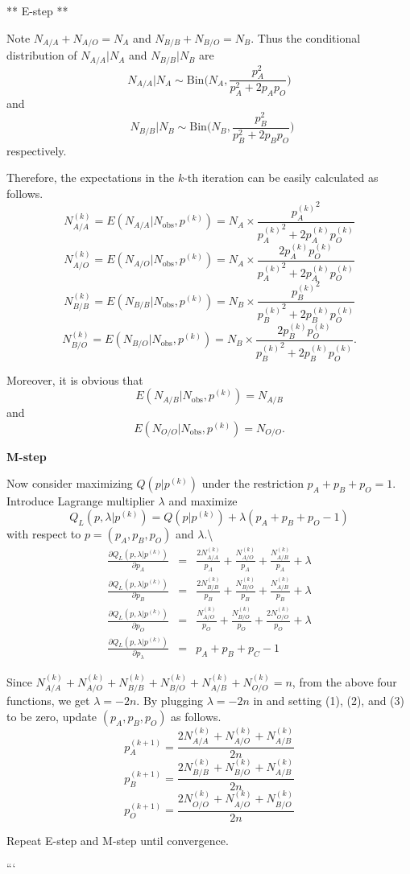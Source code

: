 \documentclass[]{article}
\begin{document}
** E-step **

Note \(N_{A/A} + N_{A/O} = N_A\) and \(N_{B/B} + N_{B/O} = N_B\). Thus
the conditional distribution of \(N_{A/A}|N_A\) and \(N_{B/B}|N_B\) are
\[
N_{A/A}|N_A \sim \text{Bin}\Biggl( N_A, \frac{p_A^2}{p_A^2 + 2 p_A p_O} \Biggr)
\] and \[
 \,\,\, N_{B/B}|N_B \sim \text{Bin}\Biggl( N_B, \frac{p_B^2}{p_B^2 + 2 p_B p_O} \Biggr)
\] respectively.

Therefore, the expectations in the \(k\)-th iteration can be easily
calculated as follows. \[
N_{A/A}^{(k)} = E(N_{A/A}|N_{\text{obs}}, p^{(k)}) = N_A \times \frac{{p_A^{(k)}}^2}{{p_A^{(k)}}^2 + 2 p_A^{(k)} p_O^{(k)}}
\] \[
N_{A/O}^{(k)} = E(N_{A/O}|N_{\text{obs}}, p^{(k)}) = N_A \times \frac{2 p_A^{(k)} p_O^{(k)}}{{p_A^{(k)}}^2 + 2 p_A^{(k)} p_O^{(k)}}
\] \[
N_{B/B}^{(k)} = E(N_{B/B}|N_{\text{obs}}, p^{(k)}) = N_B \times \frac{{p_B^{(k)}}^2}{{p_B^{(k)}}^2 + 2 p_B^{(k)} p_O^{(k)}}
\] \[
N_{B/O}^{(k)} = E(N_{B/O}|N_{\text{obs}}, p^{(k)}) = N_B \times \frac{2 p_B^{(k)} p_O^{(k)}}{{p_B^{(k)}}^2 + 2 p_B^{(k)} p_O^{(k)}}.
\]

Moreover, it is obvious that \[
E(N_{A/B}|N_{\text{obs}}, p^{(k)}) = N_{A/B}
\] and \[ 
E(N_{O/O}|N_{\text{obs}}, p^{(k)}) = N_{O/O}.
\]

\textbf{M-step}

Now consider maximizing \(Q(p|p^{(k)})\) under the restriction
\(p_A+p_B+p_O=1\). Introduce Lagrange multiplier \(\lambda\) and
maximize \[Q_L(p, \lambda|p^{(k)})=Q(p|p^{(k)})+\lambda(p_A+p_B+p_O-1)\]
with respect to \(p=(p_A, p_B, p_O)\) and \(\lambda\).\textbackslash{}
\begin{eqnarray}
\frac{\partial Q_L(p, \lambda|p^{(k)})}{\partial p_A}
&=&\frac{2N_{A/A}^{(k)}}{p_A}+\frac{N_{A/O}^{(k)}}{p_A}+\frac{N_{A/B}^{(k)}}{p_A}+\lambda\\
\frac{\partial Q_L(p, \lambda|p^{(k)})}{\partial p_B}
&=&\frac{2N_{B/B}^{(k)}}{p_B}+\frac{N_{B/O}^{(k)}}{p_B}+\frac{N_{A/B}^{(k)}}{p_B}+\lambda\\
\frac{\partial Q_L(p, \lambda|p^{(k)})}{\partial p_O}
&=&\frac{N_{A/O}^{(k)}}{p_O}+\frac{N_{B/O}^{(k)}}{p_O}+\frac{2N_{O/O}^{(k)}}{p_O}+\lambda\\
\frac{\partial Q_L(p, \lambda|p^{(k)})}{\partial p_\lambda}&=&p_A+p_B+p_C-1
\end{eqnarray}

Since
\(N_{A/A}^{(k)}+N_{A/O}^{(k)}+N_{B/B}^{(k)}+N_{B/O}^{(k)}+N_{A/B}^{(k)}+N_{O/O}^{(k)}=n\),
from the above four functions, we get \(\lambda=-2n\). By plugging
\(\lambda=-2n\) in and setting (1), (2), and (3) to be zero, update
\((p_A, p_B, p_O)\) as follows.
\[p_A^{(k+1)}=\frac{2N_{A/A}^{(k)}+N_{A/O}^{(k)}+N_{A/B}^{(k)}}{2n}\]
\[p_B^{(k+1)}=\frac{2N_{B/B}^{(k)}+N_{B/O}^{(k)}+N_{A/B}^{(k)}}{2n}\]
\[p_O^{(k+1)}=\frac{2N_{O/O}^{(k)}+N_{A/O}^{(k)}+N_{B/O}^{(k)}}{2n}\]

Repeat E-step and M-step until convergence.

```
\end{document}
